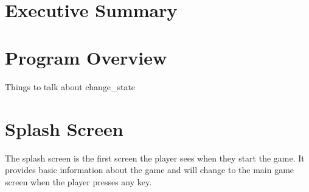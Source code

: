 \documentclass{article}
\title{
\vspace{2in}
\textmd{\huge\textbf{\Class}}\\
\textmd{{\Title}}\\
\vspace{3in}
\textmd{{\AuthorName}}\\
}
\begin{document}
\maketitle
\clearpage



\newpage
\tableofcontents
\newpage

\section{Executive Summary}

\clearpage

\section{Program Overview}
Things to talk about
\newline
change\_state
\clearpage

\section{Splash Screen}
 The splash screen is the first screen the player sees when they start the game. It provides basic information about the game and will change to the main game screen when the player presses any key.
\end{document}
